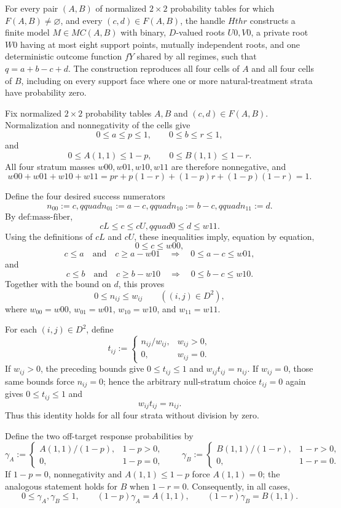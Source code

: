 For every pair \((A,B)\) of normalized \(2\times2\) probability tables for which \(F(A,B)\neq\varnothing\), and every \((c,d)\in F(A,B)\), the handle \(Hthr\) constructs a finite model \(M\in MC(A,B)\) with binary, \(D\)-valued roots \(U0,V0\), a private root \(W0\) having at most eight support points, mutually independent roots, and one deterministic outcome function \(fY\) shared by all regimes, such that \(q=a+b-c+d\).  The construction reproduces all four cells of \(A\) and all four cells of \(B\), including on every support face where one or more natural-treatment strata have probability zero.

Fix normalized \(2\times2\) probability tables \(A,B\) and \((c,d)\in F(A,B)\).  Normalization and nonnegativity of the cells give
\[
0\le a\le p\le1,\qquad 0\le b\le r\le1,
\]
and
\[
0\le A(1,1)\le1-p,
\qquad
0\le B(1,1)\le1-r.
\]
All four stratum masses \(w00,w01,w10,w11\) are therefore nonnegative, and
\[
w00+w01+w10+w11
=pr+p(1-r)+(1-p)r+(1-p)(1-r)=1.
\]

Define the four desired success numerators
\[
n_{00}:=c,qquad n_{01}:=a-c,qquad
n_{10}:=b-c,qquad n_{11}:=d.
\]
By \(\text{def:mass-fiber}\),
\[
cL\le c\le cU,qquad 0\le d\le w11.
\]
Using the definitions of \(cL\) and \(cU\), these inequalities imply, equation by equation,
\[
0\le c\le w00,
\]
\[
c\le a\quad\text{and}\quad c\ge a-w01
\quad\Longrightarrow\quad 0\le a-c\le w01,
\]
and
\[
c\le b\quad\text{and}\quad c\ge b-w10
\quad\Longrightarrow\quad 0\le b-c\le w10.
\]
Together with the bound on \(d\), this proves
\[
0\le n_{ij}\le w_{ij}\qquad((i,j)\in D^2),
\]
where \(w_{00}=w00\), \(w_{01}=w01\), \(w_{10}=w10\), and \(w_{11}=w11\).

For each \((i,j)\in D^2\), define
\[
t_{ij}:=
\begin{cases}
n_{ij}/w_{ij},&w_{ij}>0,\\
0,&w_{ij}=0.
\end{cases}
\]
If \(w_{ij}>0\), the preceding bounds give \(0\le t_{ij}\le1\) and \(w_{ij}t_{ij}=n_{ij}\).  If \(w_{ij}=0\), those same bounds force \(n_{ij}=0\); hence the arbitrary null-stratum choice \(t_{ij}=0\) again gives \(0\le t_{ij}\le1\) and
\[
w_{ij}t_{ij}=n_{ij}.
\]
Thus this identity holds for all four strata without division by zero.

Define the two off-target response probabilities by
\[
\gamma_A:=
\begin{cases}
A(1,1)/(1-p),&1-p>0,\\
0,&1-p=0,
\end{cases}
\qquad
\gamma_B:=
\begin{cases}
B(1,1)/(1-r),&1-r>0,\\
0,&1-r=0.
\end{cases}
\]
If \(1-p=0\), nonnegativity and \(A(1,1)\le1-p\) force \(A(1,1)=0\); the analogous statement holds for \(B\) when \(1-r=0\).  Consequently, in all cases,
\[
0\le\gamma_A,\gamma_B\le1,
\qquad
(1-p)\gamma_A=A(1,1),
\qquad
(1-r)\gamma_B=B(1,1).
\]

